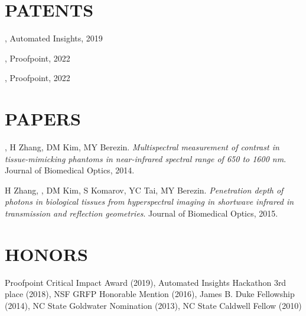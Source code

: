 \documentclass[resmargin, 11pt]{resume_style_class} %
\newenvironment{outline-cond}
  {\begin{list}{}{
  \setlength{\leftmargin}{30pt}
  \setlength\topsep{-10pt}
  \setlength\itemindent{-30pt}
  }}
  {\end{list}}
\begin{document}
\begin{resume}
\section{PATENTS}
\begin{outline-cond} 
	\item  {}, Automated Insights, 2019
	\item  {}, Proofpoint, 2022
	\item  {}, Proofpoint, 2022
\end{outline-cond} 

\section{PAPERS}
\begin{outline-cond}
	\item {}, H Zhang, DM Kim, MY Berezin. \textit{Multispectral measurement of contrast in tissue-mimicking phantoms in near-infrared spectral range of 650 to 1600 nm}. Journal of Biomedical Optics, 2014.
	\item H Zhang, , DM Kim, S Komarov, YC Tai, MY Berezin. \textit{Penetration depth of photons in biological tissues from hyperspectral imaging in shortwave infrared in transmission and reflection geometries}. Journal of Biomedical Optics, 2015.
\end{outline-cond}


\section{HONORS}
Proofpoint Critical Impact Award (2019),
Automated Insights Hackathon 3rd place (2018),
NSF GRFP Honorable Mention (2016),
James B. Duke Fellowship (2014),
NC State Goldwater Nomination (2013),
NC State Caldwell Fellow (2010)
\end{resume}
\end{document}
